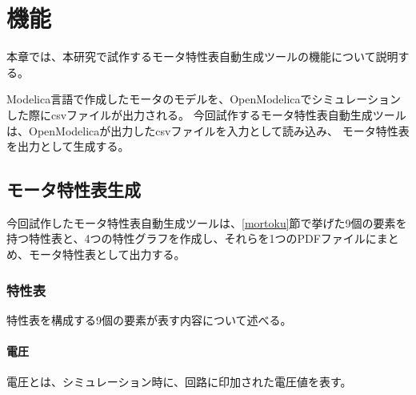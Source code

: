 \chapter{機能}\label{cha:Function}
本章では、本研究で試作するモータ特性表自動生成ツールの機能について説明する。

Modelica言語で作成したモータのモデルを、OpenModelicaでシミュレーションした際にcsvファイルが出力される。
今回試作するモータ特性表自動生成ツールは、OpenModelicaが出力したcsvファイルを入力として読み込み、
モータ特性表を出力として生成する。
\section{モータ特性表生成}\label{kenkyu_mokuteki}
今回試作したモータ特性表自動生成ツールは、\ref{mortoku}節で挙げた9個の要素を持つ特性表と、4つの特性グラフを作成し、それらを1つのPDFファイルにまとめ、モータ特性表として出力する。
\subsection{特性表}\label{sub:tokuseihyou}
特性表を構成する9個の要素が表す内容について述べる。
\subsubsection{電圧}\label{sub:sub:dennatu}
電圧とは、シミュレーション時に、回路に印加された電圧値を表す。

